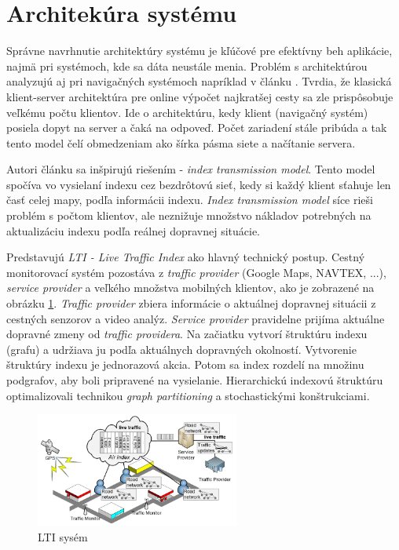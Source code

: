  
\section{Architekúra systému}
Správne navrhnutie architektúry systému je kľúčové pre efektívny beh aplikácie, najmä pri systémoch, kde sa dáta neustále menia. Problém s architektúrou analyzujú aj pri navigačných systémoch napríklad v článku \cite{onlineSP}. Tvrdia, že klasická klient-server architektúra pre online výpočet najkratšej cesty sa zle prispôsobuje veľkému počtu klientov. Ide o architektúru, kedy klient (navigačný systém) posiela dopyt na server a čaká na odpoveď. Počet zariadení stále pribúda a tak tento model čelí obmedzeniam ako šírka pásma siete a načítanie servera.

Autori článku sa inšpirujú riešením - \textit{index transmission model}. Tento model spočíva vo vysielaní indexu cez bezdrôtovú sieť, kedy si každý klient sťahuje len časť celej mapy, podľa informácii indexu. \textit{Index transmission model} síce rieši problém s počtom klientov, ale neznižuje množstvo nákladov potrebných na aktualizáciu indexu podľa reálnej dopravnej situácie.

Predstavujú \textit{LTI - Live Traffic Index} ako hlavný technický postup. Cestný monitorovací systém pozostáva z \textit{traffic provider} (Google Maps, NAVTEX, ...), \textit{service provider} a veľkého množstva mobilných klientov, ako je zobrazené na obrázku \ref{fig:LTIsystm}. \textit{Traffic provider} zbiera informácie o aktuálnej dopravnej situácii z cestných senzorov a video analýz. \textit{Service provider} pravidelne prijíma aktuálne dopravné zmeny od \textit{traffic providera}. Na začiatku vytvorí štruktúru indexu (grafu) a udržiava ju podľa aktuálnych dopravných okolností. Vytvorenie štruktúry indexu je jednorazová akcia. Potom sa index rozdelí na množinu podgrafov, aby boli pripravené na vysielanie. Hierarchickú indexovú štruktúru optimalizovali technikou \textit{graph partitioning} a stochastickými konštrukciami.

\begin{figure}[H]
\centerline{\includegraphics[width=0.6\textwidth]{images/onlineSP}}
\caption[LTI sysém]{LTI sysém}
\label{fig:LTIsystm}
\end{figure}

